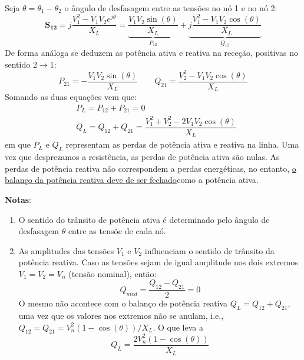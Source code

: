 \noindent Seja $\theta = \theta_1 - \theta_2$ o ângulo de desfasagem entre as tensões no nó 1 e no nó 2:
$$
\mathbf{S_{12}} = j\dfrac{ V_1^2 -  V_1 V_2 e^{j\theta}}{X_L} = \underbrace{\dfrac{V_1 V_2 \sin(\theta)}{X_L}}_{P_{12}} + \underbrace{j \dfrac{V_1^2 - V_1 V_2 \cos(\theta)}{X_L}}_{Q_{12}}
$$
De forma análoga se deduzem as potência ativa e reativa na receção, positivas no sentido $2 \rightarrow 1$:
$$
P_{21} = - \dfrac{V_1 V_2 \sin(\theta)}{X_L}\qquad 
Q_{21} = \dfrac{V_2^2 - V_1 V_2 \cos(\theta)}{X_L}
$$
Somando as duas equações vem que:
$$
\begin{aligned}
    &P_L = P_{12} + P_{21} = 0\\
    &Q_L = Q_{12} + Q_{21} = \dfrac{V_1^2 + V_2^2 - 2 V_1 V_2 \cos(\theta)}{X_L}
\end{aligned}
$$
em que $P_L$ e $Q_L$ representam as perdas de potência ativa e reativa na linha. Uma vez que desprezamos a resistência, as perdas de potência ativa são nulas. As perdas de potência reativa não correspondem a perdas energéticas, no entanto, \underline{o balanço da potência reativa deve de ser fechado}\footnotemark[1] como a potência ativa.


\begin{mdframed}
   \noindent \textbf{Notas}:
    \begin{enumerate}[nolistsep,noitemsep,leftmargin=*,label=\arabic*.,font=\small\bfseries]\small
        \item O sentido do trânsito de potência ativa é determinado pelo ângulo de desfasagem $\theta$ entre as tensõe de cada nó.
        
        \item As amplitudes das tensões $V_1$ e $V_2$ influenciam o sentido de trânsito da potência reativa. Caso as tensões sejam de igual amplitude nos dois extremos $V_1 = V_2 = V_n$ (tensão nominal), então:
        $$
            Q_{\textit{med}} = \dfrac{Q_{12} - Q_{21}}{2} = 0
        $$
        O mesmo não acontece com o balanço de potência reativa $Q_L = Q_{12} + Q_{21}$, uma vez que os valores nos extremos não se anulam, i.e., $Q_{12} = Q_{21} = V^2_n (1-\cos(\theta))/X_L$. O que leva a 
        $$
            Q_L = \frac{2V^2_n (1-\cos(\theta))}{X_L}
        $$
    \end{enumerate} 
\end{mdframed}


